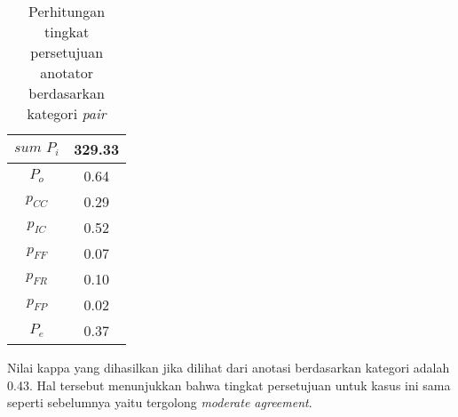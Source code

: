 \begin{table}
  \centering
  \caption{Perhitungan tingkat persetujuan anotator berdasarkan kategori \textit{pair}}
  \label{table:pair-kappa2}
  \begin{tabular}{|c|c|}
  \hline
  $sum\,\,P_i$ & 329.33 \\ \hline
  $P_o$ & 0.64 \\ \hline
  $p_{CC}$ & 0.29 \\ \hline
  $p_{IC}$ & 0.52 \\ \hline
  $p_{FF}$ & 0.07 \\ \hline
  $p_{FR}$ & 0.10 \\ \hline
  $p_{FP}$ & 0.02 \\ \hline
  $P_e$ & 0.37 \\ \hline
  \end{tabular} 
\end{table}

\noindent Nilai kappa yang dihasilkan jika dilihat dari anotasi berdasarkan kategori adalah 0.43. Hal tersebut menunjukkan bahwa tingkat persetujuan untuk kasus ini sama seperti sebelumnya yaitu tergolong \textit{moderate agreement}.

